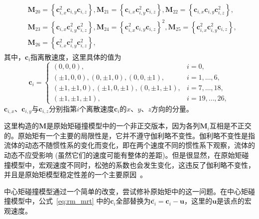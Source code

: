 \begin{align}
\begin{split}
    & \boldsymbol{M}_{20}=\left\{\boldsymbol{c}_{i, x}^2 \boldsymbol{c}_{i, y} \boldsymbol{c}_{i, z}\right\}, \boldsymbol{M}_{21}=\left\{\boldsymbol{c}_{i, x} \boldsymbol{c}_{i, y}^2 \boldsymbol{c}_{i, z}\right\}, \boldsymbol{M}_{22}=\left\{\boldsymbol{c}_{i, x} \boldsymbol{c}_{i, y} \boldsymbol{c}_{i, z}^2\right\}, \\
    & \boldsymbol{M}_{23}=\left\{\boldsymbol{c}_{i, x} \boldsymbol{c}_{i, y}^2 \boldsymbol{c}_{i, z}^2\right\}, \boldsymbol{M}_{24}=\left\{\boldsymbol{c}_{i, x}^2 \boldsymbol{c}_{i, y} \boldsymbol{c}_{i, z}\right\}^2, \boldsymbol{M}_{25}=\left\{\boldsymbol{c}_{i, x}^2 \boldsymbol{c}_{i, y}^2 \boldsymbol{c}_{i, z}\right\}, \\
    & \boldsymbol{M}_{26}=\left\{\boldsymbol{c}_{i, x}^2 \boldsymbol{c}_{i, y}^2 \boldsymbol{c}_{i, z}^2\right\},
\end{split}
\label{eq:rm_mrt}
\end{align}
其中，$\boldsymbol{c}_{i}$指离散速度，这里具体的值为
\begin{equation}
    \boldsymbol{c}_i= \begin{cases}(0,0,0), & i=0, \\
        ( \pm 1,0,0),(0, \pm 1,0),(0,0, \pm 1), & i=1, \ldots, 6, \\
        ( \pm 1, \pm 1,0),( \pm 1,0, \pm 1),(0, \pm 1, \pm 1), & i=7, \ldots, 18, \\
        ( \pm 1, \pm 1, \pm 1), & i=19, \ldots, 26,\end{cases}
\end{equation}
$\boldsymbol{c}_{i, x}$、$\boldsymbol{c}_{i, y}$与$\boldsymbol{c}_{i, z}$分别指第$i$个离散速度$\boldsymbol{c}_{i}$的$x$、$y$、$z$方向的分量。

这里构造的$\mathbf{M}$是原始矩碰撞模型中的一个非正交版本，因为各列$\mathbf{M}_{i}$互相是不正交的。原始矩有一个主要的局限性是，它并不遵守伽利略不变性。伽利略不变性是指流体的动态不随惯性系的变化而变化，即在两个速度不同的惯性系下观察，流体的动态不应受影响 (虽然它们的速度可能有整体的差距)。但是很显然，在原始矩碰撞模型中，宏观速度不同时，松弛的系数也会发生变化，这违反了伽利略不变性，并且是原始矩模型稳定性差的一个主要原因~\citep{PhysRevE.95.013310}。

中心矩碰撞模型通过一个简单的改变，尝试修补原始矩中的这一问题。在中心矩碰撞模型中，公式~\ref{eq:rm_mrt} 中的$\boldsymbol{c}_{i}$全部替换为$\bar{\boldsymbol{c}_{i}}=\boldsymbol{c}_{i}-\boldsymbol{u}$，这里的$\boldsymbol{u}$是该点的宏观速度。

